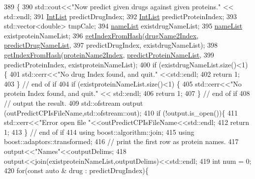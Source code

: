 \begin{DoxyCode}
389                               \{
390     std::cout<<\textcolor{stringliteral}{"Now predict given drugs against given proteins."} << std::endl;
391     \hyperlink{namespacegift_a786390fe70b2e3b6d61dba1014651f03}{IntList} predictDrugIndex;
392     \hyperlink{namespacegift_a786390fe70b2e3b6d61dba1014651f03}{IntList} predictProteinIndex;
393     std::vector<double> tmpCalc;
394     \hyperlink{namespacegift_a62f85efaab3bff48335863ae0670c7a7}{nameList} existdrugNameList;
395     \hyperlink{namespacegift_a62f85efaab3bff48335863ae0670c7a7}{nameList} existproteinNameList;
396     \hyperlink{namespacegift_a835110af070bdfb37d092c6a7f79d65c}{getIndexFromHash}(\hyperlink{namespacegift_a3385bc2f0aa26289e7f7d69635207e5d}{drugName2Index}, 
      \hyperlink{namespacegift_a9cc6da68eeea28ac6c6a65cd9f248e5b}{predictDrugNameList},
397                      predictDrugIndex, existdrugNameList);
398     \hyperlink{namespacegift_a835110af070bdfb37d092c6a7f79d65c}{getIndexFromHash}(\hyperlink{namespacegift_ad49c613c81da3c4189ea4f16915c60c5}{proteinName2Index}, 
      \hyperlink{namespacegift_a03bb78fc438e2b1af29ff3b46b70a085}{predictProteinNameList},
399                      predictProteinIndex, existproteinNameList);
400     \textcolor{keywordflow}{if} (existdrugNameList.size()<1) \{
401       std::cerr<<\textcolor{stringliteral}{"No drug Index found, and quit."} <<std::endl;
402       \textcolor{keywordflow}{return} 1;
403     \} \textcolor{comment}{// end of if}
404     \textcolor{keywordflow}{if} (existproteinNameList.size()<1) \{
405       std::cerr<<\textcolor{stringliteral}{"No protein Index found, and quit."} << std::endl;
406       \textcolor{keywordflow}{return} 1;
407     \} \textcolor{comment}{// end of if}
408     \textcolor{comment}{// output the result.}
409     std::ofstream output (outPredictCPIsFileName,std::ofstream::out);
410     \textcolor{keywordflow}{if} (!output.is\_open())\{
411       std::cerr<<\textcolor{stringliteral}{"Error open file "}<<outPredictCPIsFileName<<std::endl;
412       \textcolor{keywordflow}{return} 1;
413     \} \textcolor{comment}{// end of if}
414     \textcolor{keyword}{using} boost::algorithm::join;
415     \textcolor{keyword}{using} boost::adaptors::transformed;
416     \textcolor{comment}{// print the first row as protein names.}
417     output<<\textcolor{stringliteral}{"Names"}<<outputDelims;
418     output<<join(existproteinNameList,outputDelims)<<std::endl;
419     \textcolor{keywordtype}{int} num = 0;
420     \textcolor{keywordflow}{for}(\textcolor{keyword}{const} \textcolor{keyword}{auto} & drug : predictDrugIndex)\{

\end{DoxyCode}
